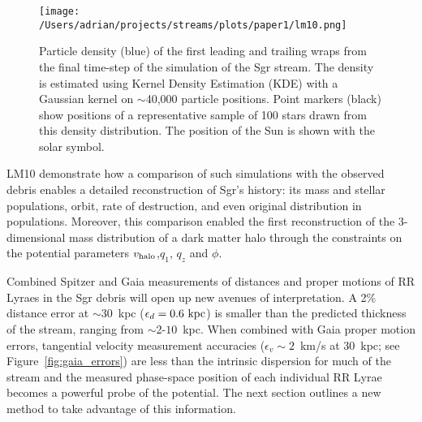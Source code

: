 \documentclass{emulateapj}
\begin{document}
\begin{figure}[h]
\begin{center}
\texttt{[image: /Users/adrian/projects/streams/plots/paper1/lm10.png]}
\caption{ Particle density (blue) of the first leading and trailing wraps from the final time-step of the \citet{law10} simulation of the Sgr stream. The density is estimated using Kernel Density Estimation (KDE) with a Gaussian kernel on $\sim$40,000 particle positions. Point markers (black) show positions of a representative sample of 100 stars drawn from this density distribution. The position of the Sun is shown with the solar symbol. }\label{fig:lm10}
\end{center}
\end{figure}

LM10 demonstrate how a comparison of such simulations with the
observed debris enables a detailed reconstruction of Sgr's history:
its mass and stellar populations, orbit, rate of destruction, and even
original distribution in populations. 
Moreover, this comparison enabled the first 
reconstruction of the 3-dimensional mass distribution of a dark matter
halo through the constraints on the potential parameters $v_{\rm halo}$,$q_1$, $q_z$ and $\phi$.

Combined Spitzer and Gaia measurements of distances and proper motions
of RR Lyraes in the Sgr debris will open up new avenues of
interpretation. A 2\% distance error at $\sim$30~kpc
($\epsilon_{d}=0.6~{\rm kpc}$) is smaller than the predicted thickness
of the stream, ranging from $\sim$2-$10$~kpc. When combined with Gaia proper motion errors,
tangential velocity measurement accuracies ($\epsilon_{v}\sim2$~km/s
at 30~kpc; see Figure~\ref{fig:gaia_errors}) are less than the intrinsic dispersion for much of the stream
\citep[$\sigma_v\sim10$~km/s;][]{majewski04} and the measured phase-space position of each individual RR
Lyrae becomes a powerful probe of the potential. The next section
outlines a new method to take advantage of this information.
\end{document}
